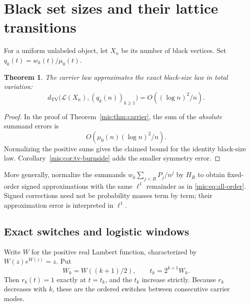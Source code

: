 \documentclass[11pt]{article}
\newtheorem{theorem}{Theorem}[section]
\theoremstyle{remark}\newtheorem{remark}[theorem]{Remark}
\newcommand{\TV}{d_{\mathrm{TV}}}
\begin{document}
\section{Black set sizes and their lattice transitions}
For a uniform unlabeled object, let $X_n$ be its number of black vertices. Set $q_k(t)=w_k(t)/\mu_0(t)$.
\begin{theorem}\label{mis:thm:law}
The carrier law approximates the exact black-size law in total variation:
\begin{equation}\label{mis:eq:law}
 \TV\bigl(\mathcal L(X_n),(q_k(n))_{k\ge1}\bigr)
       =O((\log n)^2/n).
\end{equation}
\end{theorem}
\begin{proof}
In the proof of Theorem~\ref{mis:thm:carrier}, the sum of the \emph{absolute} summand errors is\[O(\mu_0(n)(\log n)^2/n).\] Normalizing the positive sums gives the claimed bound for the identity black-size law. Corollary~\ref{mis:cor:tv-burnside} adds the smaller symmetry error.
\end{proof}
More generally, normalize the summands $w_k\sum_{j<R}P_j/n^j$ by $H_R$ to obtain fixed-order signed approximations with the same $\ell^1$ remainder as in \eqref{mis:eq:all-order}. Signed corrections need not be probability masses term by term; their approximation error is interpreted in $\ell^1$.

\subsection{Exact switches and logistic windows}
Write $W$ for the positive real Lambert function, characterized by $W(z)e^{W(z)}=z$. Put
\begin{equation}\label{mis:eq:switch}
 W_k=W((k+1)/2),\qquad t_k=2^{k+1}W_k.
\end{equation}
Then $r_k(t)=1$ exactly at $t=t_k$, and the $t_k$ increase strictly. Because $r_k$ decreases with $k$, these are the ordered switches between consecutive carrier modes.
\end{document}
